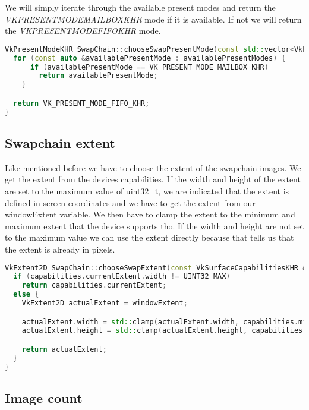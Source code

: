 \documentclass[12pt]{report} \usepackage{preamble}
\begin{document}
We will simply iterate through the available present modes and return the \\
\textit{VK\textunderscore PRESENT\textunderscore MODE\textunderscore MAILBOX\textunderscore KHR} mode
if it is available. If not we will return the \textit{VK\textunderscore PRESENT\textunderscore MODE\textunderscore FIFO\textunderscore KHR} mode.

\begin{lstlisting}[language=C++]
VkPresentModeKHR SwapChain::chooseSwapPresentMode(const std::vector<VkPresentModeKHR> &availablePresentModes) {
  for (const auto &availablePresentMode : availablePresentModes) {
      if (availablePresentMode == VK_PRESENT_MODE_MAILBOX_KHR)
        return availablePresentMode;
    }

  return VK_PRESENT_MODE_FIFO_KHR;
}
\end{lstlisting}

\subsection{Swapchain extent}

Like mentioned before we have to choose the extent of the swapchain images. We get the extent
from the devices capabilities. If the width and height of the extent are set to the maximum
value of uint32\_t, we are indicated that the extent is defined in screen coordinates and we
have to get the extent from our windowExtent variable. We then have to clamp
the extent to the minimum and maximum extent that the device supports tho. If the width and height
are not set to the maximum value we can use the extent directly because that tells us that the extent
is already in pixels.

\begin{lstlisting}[language=C++]
VkExtent2D SwapChain::chooseSwapExtent(const VkSurfaceCapabilitiesKHR &capabilities) {
  if (capabilities.currentExtent.width != UINT32_MAX)
    return capabilities.currentExtent;
  else {
    VkExtent2D actualExtent = windowExtent;

    actualExtent.width = std::clamp(actualExtent.width, capabilities.minImageExtent.width, capabilities.maxImageExtent.width);
    actualExtent.height = std::clamp(actualExtent.height, capabilities.minImageExtent.height, capabilities.maxImageExtent.height);

    return actualExtent;
  }
}
\end{lstlisting}

\subsection{Image count}
\end{document}
